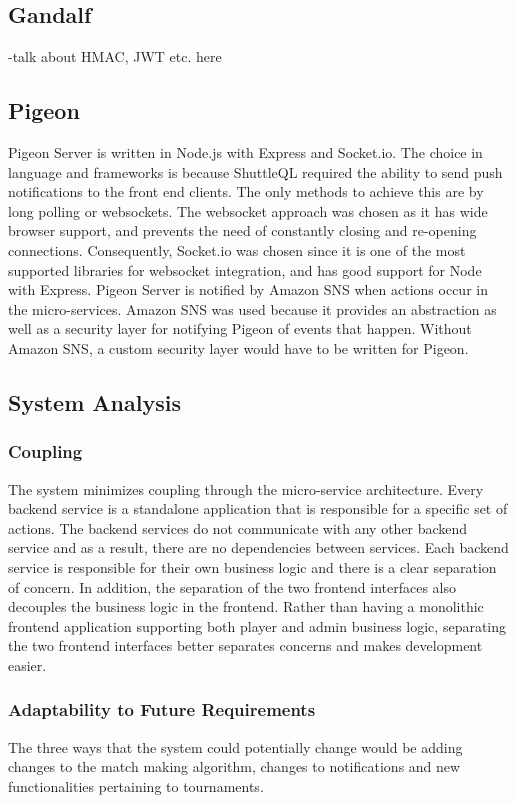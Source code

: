\documentclass{article}
\begin{document}

\subsection{Gandalf}
-talk about HMAC, JWT etc. here

\subsection{Pigeon}
Pigeon Server is written in Node.js with Express and Socket.io. The choice in language and frameworks is because ShuttleQL required the ability to send push notifications to the front end clients. The only methods to achieve this are by long polling or websockets. The websocket approach was chosen as it has wide browser support, and prevents the need of constantly closing and re-opening connections. Consequently, Socket.io was chosen since it is one of the most supported libraries for websocket integration, and has good support for Node with Express. Pigeon Server is notified by Amazon SNS when actions occur in the micro-services. Amazon SNS was used because it provides an abstraction as well as a security layer for notifying Pigeon of events that happen. Without Amazon SNS, a custom security layer would have to be written for Pigeon.

\subsection{System Analysis}

\subsubsection{Coupling}
The system minimizes coupling through the micro-service architecture. Every backend service is a standalone application that is responsible for a specific set of actions. The backend services do not communicate with any other backend service and as a result, there are no dependencies between services. Each backend service is responsible for their own business logic and there is a clear separation of concern. In addition, the separation of the two frontend interfaces also decouples the business logic in the frontend. Rather than having a monolithic frontend application supporting both player and admin business logic, separating the two frontend interfaces better separates concerns and makes development easier.

\subsubsection{Adaptability to Future Requirements}
The three ways that the system could potentially change would be adding changes to the match making algorithm, changes to notifications and new functionalities pertaining to tournaments.
\end{document}
